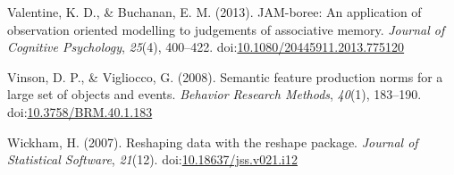 \documentclass[english,,man]{apa6}
\begin{document}
\hypertarget{ref-Valentine2013}{}
Valentine, K. D., \& Buchanan, E. M. (2013). JAM-boree: An application
of observation oriented modelling to judgements of associative memory.
\emph{Journal of Cognitive Psychology}, \emph{25}(4), 400--422.
doi:\href{https://doi.org/10.1080/20445911.2013.775120}{10.1080/20445911.2013.775120}

\hypertarget{ref-Vinson2008}{}
Vinson, D. P., \& Vigliocco, G. (2008). Semantic feature production
norms for a large set of objects and events. \emph{Behavior Research
Methods}, \emph{40}(1), 183--190.
doi:\href{https://doi.org/10.3758/BRM.40.1.183}{10.3758/BRM.40.1.183}

\hypertarget{ref-Wickham2007}{}
Wickham, H. (2007). Reshaping data with the reshape package.
\emph{Journal of Statistical Software}, \emph{21}(12).
doi:\href{https://doi.org/10.18637/jss.v021.i12}{10.18637/jss.v021.i12}
\end{document}
